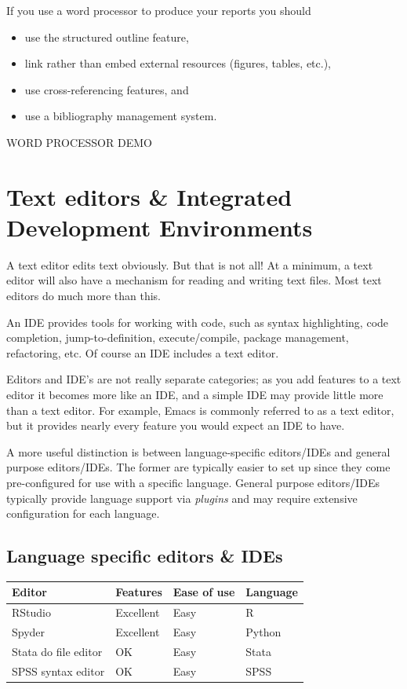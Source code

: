 \documentclass[]{book}
\providecommand{\tightlist}{%
  \setlength{\itemsep}{0pt}\setlength{\parskip}{0pt}}
\begin{document}
If you use a word processor to produce your reports you should

\begin{itemize}
\tightlist
\item
  use the structured outline feature,
\item
  link rather than embed external resources (figures, tables, etc.),
\item
  use cross-referencing features, and
\item
  use a bibliography management system.
\end{itemize}

WORD PROCESSOR DEMO

\section{Text editors \& Integrated Development
Environments}\label{text-editors-integrated-development-environments}

A text editor edits text obviously. But that is not all! At a minimum, a
text editor will also have a mechanism for reading and writing text
files. Most text editors do much more than this.

An IDE provides tools for working with code, such as syntax
highlighting, code completion, jump-to-definition, execute/compile,
package management, refactoring, etc. Of course an IDE includes a text
editor.

Editors and IDE's are not really separate categories; as you add
features to a text editor it becomes more like an IDE, and a simple IDE
may provide little more than a text editor. For example, Emacs is
commonly referred to as a text editor, but it provides nearly every
feature you would expect an IDE to have.

A more useful distinction is between language-specific editors/IDEs and
general purpose editors/IDEs. The former are typically easier to set up
since they come pre-configured for use with a specific language. General
purpose editors/IDEs typically provide language support via
\emph{plugins} and may require extensive configuration for each
language.

\subsection{Language specific editors \&
IDEs}\label{language-specific-editors-ides}

\begin{longtable}[]{@{}llll@{}}
\toprule
Editor & Features & Ease of use & Language\tabularnewline
\midrule
\endhead
RStudio & Excellent & Easy & R\tabularnewline
Spyder & Excellent & Easy & Python\tabularnewline
Stata do file editor & OK & Easy & Stata\tabularnewline
SPSS syntax editor & OK & Easy & SPSS\tabularnewline
\bottomrule
\end{longtable}
\end{document}
